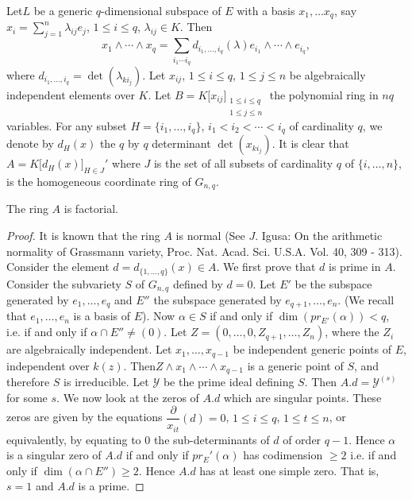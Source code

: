   \noindent
  Let\pageoriginale $L$ be a generic $q$-dimensional subspace of $E$
  with a basis 
  $x_1, \ldots x_q$, say $x_i = \sum\limits_{j = 1}^n \lambda_{ij }
  e_j$, $1 \le i \le q$, $\lambda_{ij} \in K$. Then 
$$
  x_1 \wedge \cdots \wedge x_q = \sum\limits_{i_1 \cdots i_q} d_{i_1, 
  \ldots, i_q} (\lambda) e_{i_1} \wedge \cdots \wedge e_{i_q},   
$$
  where $d_{i_1, \ldots , i_q} = \det (\lambda_{k i_j})$. Let $x_{ij}$,
  $1 \le i \le q$, $1 \le j \le n$ be algebraically independent elements
  over $K$. Let  $B = K \big[x_{ij}\big]_{\substack{1 \le i \le q
      \\ 1 \le j \le n}}$ the polynomial ring in $nq$ variables. For
  any subset $H = \big \{i_1, \ldots , i_q \big \}$, $i_1 < i_2 < \cdots
  < i_q$ of cardinality $q$, we denote by $d_H(x)$ the $q$ by $q$
  determinant $\det(x_{ki_j})$. It is clear that $A = K \big[d_H (x)
    \big]_{H \in J}'$ where $J$ is the set of all subsets of
  cardinality $q$ of $\big\{i, \ldots , n \big \}$, is the
  homogeneous coordinate ring of $G_{n, q}$. 
  
\begin{prop} %
The ring $A$ is factorial. 
\end{prop}  
      
\begin{proof}
It is known that the ring $A$ is normal (See $J$. Igusa: On the
arithmetic normality of Grassmann variety,
Proc. Nat. Acad. Sci. U.S.A. Vol. 40, 309 - 313). Consider the
element $d = d_{\{1, \ldots , q\}} (x) \in A$. We first prove that $d$ is
prime in $A$. Consider the subvariety $S$ of $G_{n, q}$ defined by $d=
0$. Let $E'$ be the subspace generated by $e_1, \ldots , e_q$ and
$E''$ the subspace generated by $e_{q+1}, \ldots , e_n$. (We recall
that $e_1, \ldots , e_n$ is a basis of $E$). Now $\alpha \in S$ if and
only if $\dim (pr_{E'} (\alpha )) < q$, i.e. if and only if $\alpha \cap
E'' \neq (0)$. Let $Z = (0, \ldots , 0, Z_{q+1}, \ldots , Z_n)$, where the
$Z_i$ are algebraically independent. Let $x_1, \ldots , x_{q-1}$ be
independent generic points of $E$, independent over
$k(z)$. Then\pageoriginale $Z 
\wedge x_1 \wedge \cdots \wedge x_{q-1}$ is a generic point of $S$,
and therefore $S$ is irreducible. Let $\mathscr{Y}$ be the prime ideal
defining $S$. Then $A.d = \mathscr{Y}^{(s)}$ for some $s$. We now look
at the zeros of $A.d$ which are singular points. These zeros are given
by the equations $\dfrac{\partial}{x_{it}}(d) = 0$, $1 \le i \le q$, $1 \le
t \le n$, or equivalently, by equating to 0 the sub-determinants of
$d$ of order $q-1$. Hence $\alpha$ is a singular zero of $A.d$ if and
only if $pr_E' (\alpha)$ has codimension $\ge 2$ i.e. if and only if
$\dim (\alpha \cap E'') \ge 2$. Hence $A.d$ has at least one simple
zero. That is, $s=1$ and $A.d$ is  a prime. 
\end{proof}    
    
